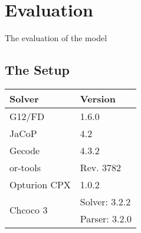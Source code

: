 \chapter{Evaluation}
The evaluation of the model

\section{The Setup}

\begin{tabular}{l|l}
Solver                    & Version \\ \hline
G12/FD                    & 1.6.0\\
JaCoP                     & 4.2 \\
Gecode                    & 4.3.2 \\
or-tools                  & Rev. 3782 \\
Opturion CPX              & 1.0.2 \\
\multirow{2}{*}{Chcoco 3} & Solver: 3.2.2 \\
                          & Parser: 3.2.0
\end{tabular}

\begin{landscape}
\hspace*{\fill}
\noindent
\hspace*{\fill}
\\
\hspace*{\fill}

\hspace*{\fill}
\\
\hspace*{\fill}

\hspace*{\fill}
\\
\hspace*{\fill}

\hspace*{\fill}
\\
\hspace*{\fill}

\hspace*{\fill}
\\
\hspace*{\fill}

\hspace*{\fill}
\\
\hspace*{\fill}

\hspace*{\fill}
\end{landscape}

